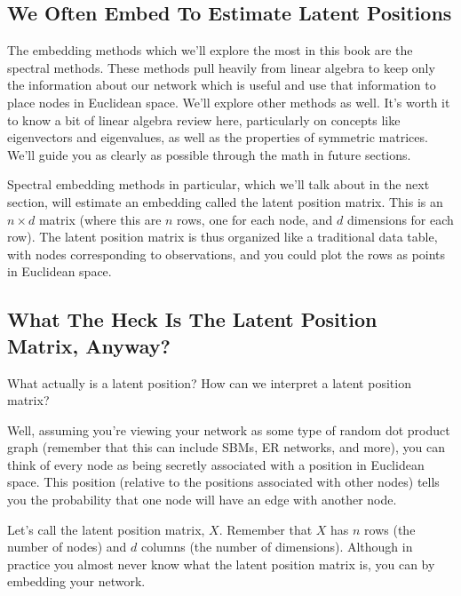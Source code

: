 \documentclass[letterpaper,10pt,english]{jupyterBook}
\begin{document}
\subsection{We Often Embed To Estimate Latent Positions}
\label{\detokenize{representations/ch6/why-embed-networks:we-often-embed-to-estimate-latent-positions}}
\sphinxAtStartPar
The embedding methods which we’ll explore the most in this book are the spectral methods. These methods pull heavily from linear algebra to keep only the information about our network which is useful \sphinxhyphen{} and use that information to place nodes in Euclidean space. We’ll explore other methods as well. It’s worth it to know a bit of linear algebra review here, particularly on concepts like eigenvectors and eigenvalues, as well as the properties of symmetric matrices. We’ll guide you as clearly as possible through the math in future sections.

\sphinxAtStartPar
Spectral embedding methods in particular, which we’ll talk about in the next section, will estimate an embedding called the latent position matrix. This is an \(n \times d\) matrix (where this are \(n\) rows, one for each node, and \(d\) dimensions for each row). The latent position matrix is thus organized like a traditional data table, with nodes corresponding to observations, and you could plot the rows as points in Euclidean space.


\subsection{What The Heck Is The Latent Position Matrix, Anyway?}
\label{\detokenize{representations/ch6/why-embed-networks:what-the-heck-is-the-latent-position-matrix-anyway}}
\sphinxAtStartPar
What actually is a latent position? How can we interpret a latent position matrix?

\sphinxAtStartPar
Well, assuming you’re viewing your network as some type of random dot product graph (remember that this can include SBMs, ER networks, and more), you can think of every node as being secretly associated with a position in Euclidean space. This position (relative to the positions associated with other nodes) tells you the probability that one node will have an edge with another node.

\sphinxAtStartPar
Let’s call the latent position matrix, \(X\). Remember that \(X\) has \(n\) rows (the number of nodes) and \(d\) columns (the number of dimensions). Although in practice you almost never know what the latent position matrix  is, you can  by embedding your network.
\end{document}
